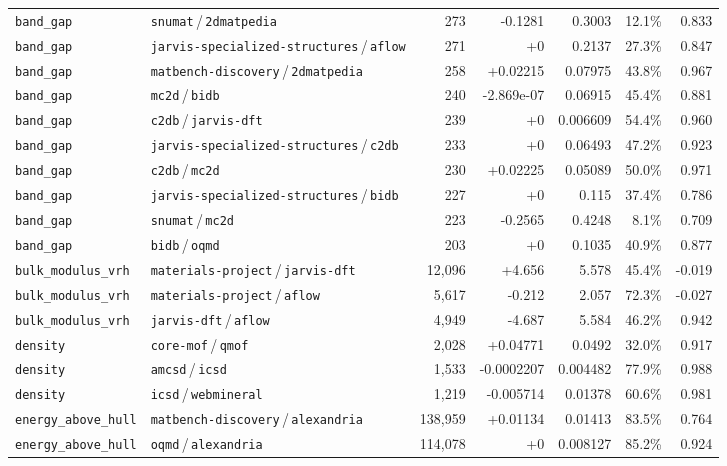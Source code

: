 \begin{longtable}{llrrrrr}
\texttt{band\_gap} & \texttt{snumat}\,/\,\texttt{2dmatpedia} & 273 & -0.1281 & 0.3003 & 12.1\% & 0.833 \\
\texttt{band\_gap} & \texttt{jarvis-specialized-structures}\,/\,\texttt{aflow} & 271 & +0 & 0.2137 & 27.3\% & 0.847 \\
\texttt{band\_gap} & \texttt{matbench-discovery}\,/\,\texttt{2dmatpedia} & 258 & +0.02215 & 0.07975 & 43.8\% & 0.967 \\
\texttt{band\_gap} & \texttt{mc2d}\,/\,\texttt{bidb} & 240 & -2.869e-07 & 0.06915 & 45.4\% & 0.881 \\
\texttt{band\_gap} & \texttt{c2db}\,/\,\texttt{jarvis-dft} & 239 & +0 & 0.006609 & 54.4\% & 0.960 \\
\texttt{band\_gap} & \texttt{jarvis-specialized-structures}\,/\,\texttt{c2db} & 233 & +0 & 0.06493 & 47.2\% & 0.923 \\
\texttt{band\_gap} & \texttt{c2db}\,/\,\texttt{mc2d} & 230 & +0.02225 & 0.05089 & 50.0\% & 0.971 \\
\texttt{band\_gap} & \texttt{jarvis-specialized-structures}\,/\,\texttt{bidb} & 227 & +0 & 0.115 & 37.4\% & 0.786 \\
\texttt{band\_gap} & \texttt{snumat}\,/\,\texttt{mc2d} & 223 & -0.2565 & 0.4248 & 8.1\% & 0.709 \\
\texttt{band\_gap} & \texttt{bidb}\,/\,\texttt{oqmd} & 203 & +0 & 0.1035 & 40.9\% & 0.877 \\
\texttt{bulk\_modulus\_vrh} & \texttt{materials-project}\,/\,\texttt{jarvis-dft} & 12{,}096 & +4.656 & 5.578 & 45.4\% & -0.019 \\
\texttt{bulk\_modulus\_vrh} & \texttt{materials-project}\,/\,\texttt{aflow} & 5{,}617 & -0.212 & 2.057 & 72.3\% & -0.027 \\
\texttt{bulk\_modulus\_vrh} & \texttt{jarvis-dft}\,/\,\texttt{aflow} & 4{,}949 & -4.687 & 5.584 & 46.2\% & 0.942 \\
\texttt{density} & \texttt{core-mof}\,/\,\texttt{qmof} & 2{,}028 & +0.04771 & 0.0492 & 32.0\% & 0.917 \\
\texttt{density} & \texttt{amcsd}\,/\,\texttt{icsd} & 1{,}533 & -0.0002207 & 0.004482 & 77.9\% & 0.988 \\
\texttt{density} & \texttt{icsd}\,/\,\texttt{webmineral} & 1{,}219 & -0.005714 & 0.01378 & 60.6\% & 0.981 \\
\texttt{energy\_above\_hull} & \texttt{matbench-discovery}\,/\,\texttt{alexandria} & 138{,}959 & +0.01134 & 0.01413 & 83.5\% & 0.764 \\
\texttt{energy\_above\_hull} & \texttt{oqmd}\,/\,\texttt{alexandria} & 114{,}078 & +0 & 0.008127 & 85.2\% & 0.924 \\

\end{longtable}
